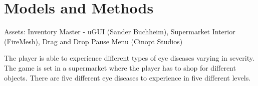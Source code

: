 \documentclass{acm_proc_article-sp}
\begin{document}
\section{Models and Methods}

Assets: Inventory Master - uGUI (Sander Buchheim), Supermarket Interior (FireMesh), Drag and Drop Pause Menu (Cinopt Studios)

The player is able to experience different types of eye diseases varying in severity.
%
%
The game is set in a supermarket where the player has to shop for different objects.
There are five different eye diseases to experience in five different levels.

\end{document}
